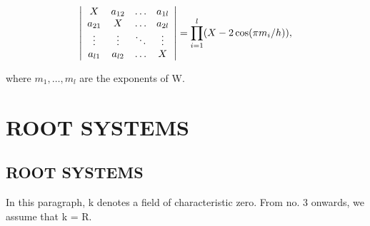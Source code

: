 \[
\left| \begin{array}{c c c c} X & a _ {1 2} & \ldots & a _ {1 l} \\ a _ {2 1} & X & \ldots & a _ {2 l} \\ \vdots & \vdots & \ddots & \vdots \\ a _ {l 1} & a _ {l 2} & \ldots & X \end{array} \right| = \prod_ {i = 1} ^ {l} (X - 2 \cos (\pi m _ {i} / h)),
\]

where \(m_{1},\ldots ,m_{l}\) are the exponents of W.

\chapter{ROOT SYSTEMS}

\section{ROOT SYSTEMS}

In this paragraph, k denotes a field of characteristic zero. From no. 3 onwards, we assume that k = R.
